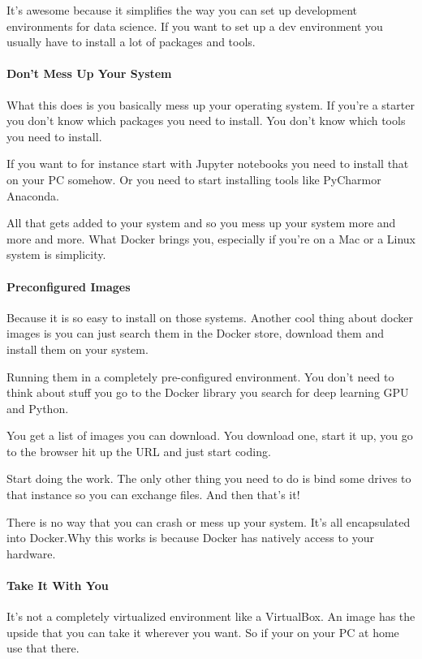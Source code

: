 \documentclass[12pt]{scrartcl} %
\begin{document}
It’s awesome because it simplifies the way you can set up development environments for data science. If you want to set up a dev environment you usually have to install a lot of packages and tools.

\paragraph{Don’t Mess Up Your System}

What this does is you basically mess up your operating system. If you’re a starter you don’t know which packages you need to install. You don’t know which tools you need to install.

If you want to for instance start with Jupyter notebooks you need to install that on your PC somehow. Or you need to start installing tools like PyCharmor Anaconda.

All that gets added to your system and so you mess up your system more and more and more. What Docker brings you, especially if you’re on a Mac or a Linux system is simplicity.

\paragraph{Preconfigured Images}

Because it is so easy to install on those systems. Another cool thing about docker images is you can just search them in the Docker store, download them and install them on your system.

Running them in a completely pre-configured environment. You don’t need to think about stuff you go to the Docker library you search for deep learning GPU and Python.

You get a list of images you can download. You download one, start it up, you go to the browser hit up the URL and just start coding.

Start doing the work. The only other thing you need to do is bind some drives to that instance so you can exchange files. And then that’s it!

There is no way that you can crash or mess up your system. It’s all encapsulated into Docker.Why this works is because Docker has natively access to your hardware.

\paragraph{Take It With You}

It’s not a completely virtualized environment like a VirtualBox. An image has the upside that you can take it wherever you want. So if your on your PC at home use that there.
\end{document}
